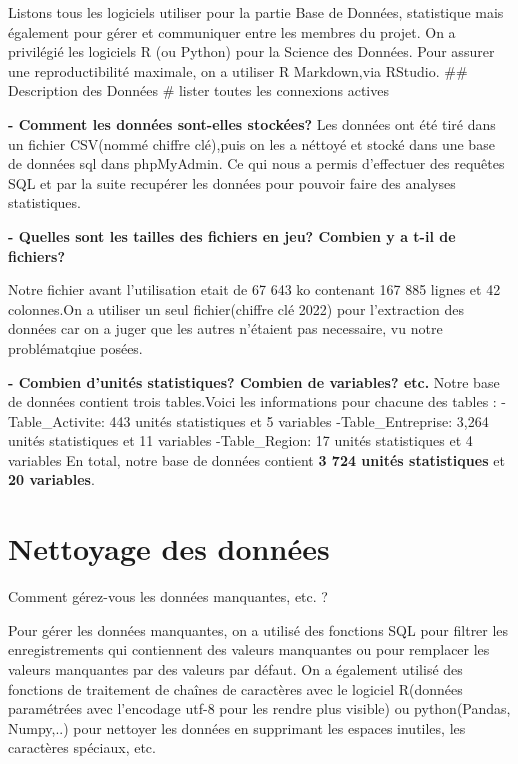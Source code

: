 \documentclass[mstat,12pt]{unswthesis}
\begin{document}
Listons tous les logiciels utiliser pour la partie Base de Données,
statistique mais également pour gérer et communiquer entre les membres
du projet. \medskip On a privilégié les logiciels R (ou Python) pour la
Science des Données. Pour assurer une reproductibilité maximale, on a
utiliser R Markdown,via RStudio. \bigskip \#\# Description des Données
\# lister toutes les connexions actives

\textbf{- Comment les données sont-elles stockées?} Les données ont été
tiré dans un fichier CSV(nommé chiffre clé),puis on les a néttoyé et
stocké dans une base de données sql dans phpMyAdmin. Ce qui nous a
permis d'effectuer des requêtes SQL et par la suite recupérer les
données pour pouvoir faire des analyses statistiques.

\textbf{- Quelles sont les tailles des fichiers en jeu? Combien y a t-il
de fichiers?}

Notre fichier avant l'utilisation etait de 67 643 ko contenant 167 885
lignes et 42 colonnes.On a utiliser un seul fichier(chiffre clé 2022)
pour l'extraction des données car on a juger que les autres n'étaient
pas necessaire, vu notre problématqiue posées.

\textbf{- Combien d'unités statistiques? Combien de variables? etc.}
Notre base de données contient trois tables.Voici les informations pour
chacune des tables : \medskip -Table\_Activite: 443 unités statistiques
et 5 variables \medskip -Table\_Entreprise: 3,264 unités statistiques et
11 variables \medskip -Table\_Region: 17 unités statistiques et 4
variables \medskip En total, notre base de données contient \textbf{3
724 unités statistiques} et \textbf{20 variables}.

\hypertarget{nettoyage-des-donnuxe9es}{%
\section{Nettoyage des données}\label{nettoyage-des-donnuxe9es}}

Comment gérez-vous les données manquantes, etc. ?

Pour gérer les données manquantes, on a utilisé des fonctions SQL pour
filtrer les enregistrements qui contiennent des valeurs manquantes ou
pour remplacer les valeurs manquantes par des valeurs par défaut. On a
également utilisé des fonctions de traitement de chaînes de caractères
avec le logiciel R(données paramétrées avec l'encodage utf-8 pour les
rendre plus visible) ou python(Pandas, Numpy,..) pour nettoyer les
données en supprimant les espaces inutiles, les caractères spéciaux,
etc.
\end{document}
